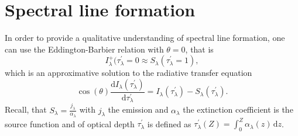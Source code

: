 \documentclass[a4paper,12pt]{report}
\begin{document}

\section{Spectral line formation}
In order to provide a qualitative understanding of spectral line formation, one can use the Eddington-Barbier relation with $\theta = 0$, that is \begin{equation}
I_\lambda^+(\tau_\lambda^\prime = 0 \approx S_\lambda(\tau_\lambda^\prime = 1),
\end{equation} which is an approximative solution to the radiative transfer equation \begin{equation}
\cos(\theta)\frac{\mathrm{d}I_\lambda(\tau_\lambda^\prime)}{\mathrm{d}\tau_\lambda^\prime} = I_\lambda(\tau_\lambda^\prime) - S_\lambda(\tau_\lambda^\prime).
\end{equation} Recall, that $S_\lambda = \frac{j_\lambda}{\alpha_\lambda}$ with $j_\lambda$ the emission and $\alpha_\lambda$ the extinction coefficient is the source function and of optical depth $\tau_\lambda^\prime$ is defined as $\tau_\lambda^\prime(Z)  = \int_{0}^{Z}\alpha_\lambda(z)\,\mathrm{d}z$.
\end{document}
